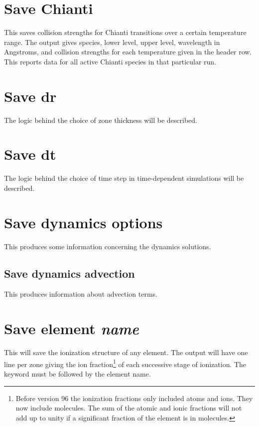 \section{Save Chianti}
\label{sec:CommandSaveChianti}

This saves collision strengths for Chianti transitions over a certain temperature range.
The output gives species, lower level, upper level, wavelength in Angstroms, 
and collision strengths for each temperature given in the header row.
This reports data for all active Chianti species in that particular run.

\section{Save dr}

The logic behind the choice of zone thickness will be described.

\section{Save dt}

The logic behind the choice of time step in time-dependent simulations will be described.

\section{Save dynamics options}

This produces some information concerning the dynamics solutions.

\subsection{Save dynamics advection}

This produces information about advection terms.

\section{Save element \emph{name}}

This will save the ionization structure of any element. The output will
have one line per zone giving the ion fraction\footnote{Before version 96 the ionization fractions only included atoms and
ions.  They now include molecules.  The sum of the atomic and ionic fractions
will not add up to unity if a significant fraction of the element is in
molecules.} of each successive stage
of ionization.  The keyword  must be followed by the element name.

